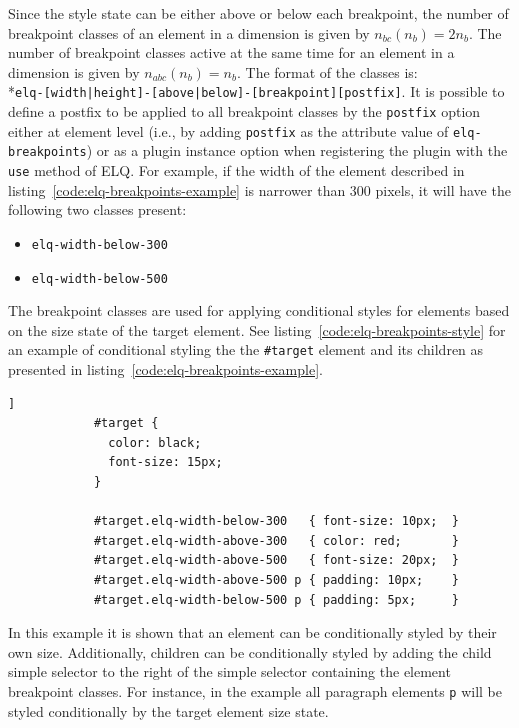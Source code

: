 \documentclass[a4paper,11pt]{kth-mag}
\newcommand{\code}[1]{\texttt{#1}}
\begin{document}
          Since the style state can be either above or below each breakpoint, the number of breakpoint classes of an element in a dimension is given by $n_{bc}(n_{b}) = 2n_b$.
          The number of breakpoint classes active at the same time for an element in a dimension is given by $n_{abc}(n_{b}) = n_{b}$.
          The format of the classes is: \\*\code{elq-[width|height]-[above|below]-[breakpoint][postfix]}.
          It is possible to define a postfix to be applied to all breakpoint classes by the \code{postfix} option either at element level (i.e., by adding \code{postfix} as the attribute value of \code{elq-breakpoints}) or as a plugin instance option when registering the plugin with the \code{use} method of \gls{ELQ}.
          For example, if the width of the element described in listing~\ref{code:elq-breakpoints-example} is narrower than 300 pixels, it will have the following two classes present:
          \begin{itemize}
            \item \code{elq-width-below-300}
            \item \code{elq-width-below-500}
          \end{itemize}
          The breakpoint classes are used for applying conditional styles for elements based on the size state of the target element.
          See listing~\ref{code:elq-breakpoints-style} for an example of conditional styling the the \code{\#target} element and its children as presented in listing~\ref{code:elq-breakpoints-example}.
          \begin{lstlisting}[gobble=12,caption={Example of conditional styles using the \code{elq-breakpoints} plugin classes.},captionpos=b,label={code:elq-breakpoints-style}]]
            #target {
              color: black;
              font-size: 15px;
            }

            #target.elq-width-below-300   { font-size: 10px;  }
            #target.elq-width-above-300   { color: red;       }
            #target.elq-width-above-500   { font-size: 20px;  }
            #target.elq-width-above-500 p { padding: 10px;    }
            #target.elq-width-below-500 p { padding: 5px;     }
          \end{lstlisting}
          In this example it is shown that an element can be conditionally styled by their own size.
          Additionally, children can be conditionally styled by adding the child simple selector to the right of the simple selector containing the element breakpoint classes.
          For instance, in the example all paragraph elements \code{p} will be styled conditionally by the target element size state.
\end{document}
